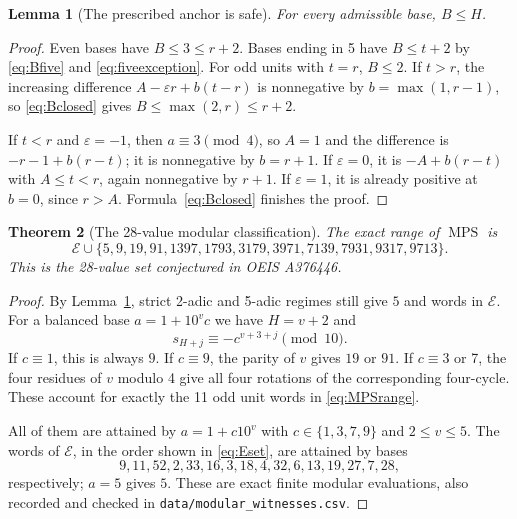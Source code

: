 \documentclass[11pt,letterpaper]{article}
\numberwithin{equation}{section}
\newtheorem{theorem}{Theorem}[section]
\newtheorem{lemma}[theorem]{Lemma}
\theoremstyle{definition}
\newcommand{\MPS}{\operatorname{MPS}}
\newcommand{\Eset}{\mathcal E}
\begin{document}
\begin{lemma}[The prescribed anchor is safe]\label{lem:safeH}
For every admissible base, $B\leq H$.
\end{lemma}
\begin{proof}
Even bases have $B\leq3\leq r+2$. Bases ending in 5 have $B\leq t+2$ by
\eqref{eq:Bfive} and \eqref{eq:fiveexception}. For odd units with $t=r$,
$B\leq2$. If $t>r$, the increasing difference
$A-\varepsilon r+b(t-r)$ is nonnegative by $b=\max(1,r-1)$, so
\eqref{eq:Bclosed} gives $B\leq\max(2,r)\leq r+2$.

If $t<r$ and $\varepsilon=-1$, then $a\equiv3\pmod4$, so $A=1$ and the
difference is $-r-1+b(r-t)$; it is nonnegative by $b=r+1$.
If $\varepsilon=0$, it is $-A+b(r-t)$ with $A\leq t<r$, again nonnegative
by $r+1$. If $\varepsilon=1$, it is already positive at $b=0$, since
$r>A$. Formula~\eqref{eq:Bclosed} finishes the proof.
\end{proof}

\begin{theorem}[The 28-value modular classification]\label{thm:modular}
The exact range of $\MPS$ is
\begin{equation}\label{eq:MPSrange}
\Eset\cup\{5,9,19,91,1397,1793,3179,3971,7139,7931,9317,9713\}.
\end{equation}
This is the 28-value set conjectured in OEIS A376446.
\end{theorem}
\begin{proof}
By Lemma~\ref{lem:safeH}, strict 2-adic and 5-adic regimes still give $5$ and
words in $\Eset$. For a balanced base $a=1+10^v c$ we have $H=v+2$ and
\begin{equation}\label{eq:MPSbalanced}
 s_{H+j}\equiv-c^{v+3+j}\pmod {10}.
\end{equation}
If $c\equiv1$, this is always $9$. If $c\equiv9$, the parity of $v$ gives
$19$ or $91$. If $c\equiv3$ or 7, the four residues of $v$ modulo 4 give all
four rotations of the corresponding four-cycle. These account for exactly the
11 odd unit words in \eqref{eq:MPSrange}.

All of them are attained by $a=1+c10^v$ with $c\in\{1,3,7,9\}$ and
$2\leq v\leq5$. The words of $\Eset$, in the order shown in
\eqref{eq:Eset}, are attained by bases
\[
9,11,52,2,33,16,3,18,4,32,6,13,19,27,7,28,
\]
respectively; $a=5$ gives $5$. These are exact finite modular evaluations, also
recorded and checked in \texttt{data/modular\_witnesses.csv}.
\end{proof}
\end{document}
